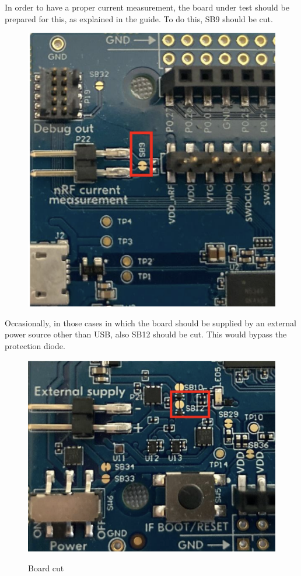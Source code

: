 \documentclass{Configuration_Files/PoliMi3i_thesis}
\begin{document}
In order to have a proper current measurement, the board under test should be prepared for this, as explained in the guide.
To do this, SB9 should be cut.


\begin{figure}[H]
    \centering
    \includegraphics[scale=0.6]{Test_Procedure/15.png}
    \label{direct_communication_board_PC_15}
\end{figure}

Occasionally, in those cases in which the board should be supplied by an external power source other than USB, also SB12 should be cut. This would bypass the protection diode.

\begin{figure}[H]
    \centering
    \includegraphics[scale=0.6]{Test_Procedure/16.png}
    \label{direct_communication_board_PC_16}
    \caption{Board cut}
\end{figure}
\end{document}
